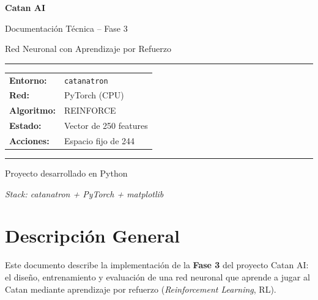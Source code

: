 \documentclass[11pt, a4paper]{article}
\begin{document}
\begin{titlepage}
  \centering
  \vspace*{3cm}
  {\Huge\bfseries Catan AI\par}
  \vspace{0.5cm}
  {\Large Documentación Técnica -- Fase 3\par}
  \vspace{0.3cm}
  {\large Red Neuronal con Aprendizaje por Refuerzo\par}
  \vspace{2cm}
  \rule{0.6\textwidth}{0.4pt}
  \vspace{0.5cm}

  \begin{tabular}{ll}
    \textbf{Entorno:}    & \texttt{catanatron}       \\
    \textbf{Red:}        & PyTorch (CPU)             \\
    \textbf{Algoritmo:}  & REINFORCE                 \\
    \textbf{Estado:}     & Vector de 250 features    \\
    \textbf{Acciones:}   & Espacio fijo de 244       \\
  \end{tabular}

  \vspace{2cm}
  \rule{0.6\textwidth}{0.4pt}
  \vspace{0.5cm}

  {\large Proyecto desarrollado en Python}\par
  \vspace{0.3cm}
  {\large\textit{Stack: catanatron + PyTorch + matplotlib}}\par
  \vfill
\end{titlepage}

\tableofcontents
\newpage

\section{Descripción General}

Este documento describe la implementación de la \textbf{Fase 3} del proyecto Catan AI: el
diseño, entrenamiento y evaluación de una red neuronal que aprende a jugar al Catan mediante
aprendizaje por refuerzo (\textit{Reinforcement Learning}, RL).
\end{document}
